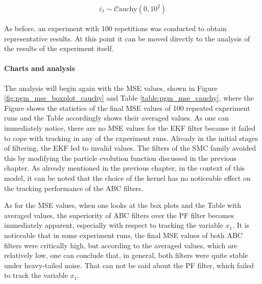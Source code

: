 \begin{equation}
\begin{aligned}
\varepsilon_t \sim \mathcal{C}\text{auchy}\left(0, 10^2\right)
\end{aligned}
\end{equation}

As before,  an experiment with 100 repetitions was conducted to obtain representative results. At this point it can be moved directly to the analysis of the results of the experiment itself.

\paragraph*{Charts and analysis} 
The analysis will begin again with the MSE values, shown in Figure \ref{fig:pgm_mse_boxplot_cauchy} and Table \ref{table:pgm_mse_cauchy}, where the Figure shows the statistics of the final MSE values of 100 repeated experiment runs and the Table accordingly shows their averaged values. As one can immediately notice, there are no MSE values for the EKF filter because it failed to cope with tracking in any of the experiment runs. Already in the initial stages of filtering, the EKF led to invalid values. The filters of the SMC family avoided this by modifying the particle evolution function discussed in the previous chapter. As already mentioned in the previous chapter, in the context of this model, it can be noted that the choice of the kernel has no noticeable effect on the tracking performance of the ABC filters.

As for the MSE values, when one looks at the box plots and the Table with averaged values, the superiority of ABC filters over the PF filter becomes immediately apparent, especially with respect to tracking the variable \(x_1\). It is noticeable that in some experiment runs, the final MSE values of both ABC filters were critically high, but according to the averaged values, which are relatively low, one can conclude that, in general, both filters were quite stable under heavy-tailed noise. That can not be said about the PF filter, which failed to track the variable \(x_1\).

